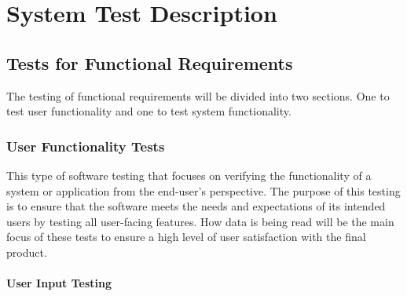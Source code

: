 \documentclass[12pt, titlepage]{article}
\begin{document}

\section{System Test Description}
	
\subsection{Tests for Functional Requirements}

The testing of functional requirements will be divided into two sections. One to test user functionality and one to test system functionality. 

\subsubsection{User Functionality Tests}

This type of software testing that focuses on verifying the functionality of a system or application from the end-user's perspective. The purpose of this testing is to ensure that the software meets the needs and expectations of its intended users by testing all user-facing features. How data is being read will be the main focus of these tests to ensure a high level of user satisfaction with the final product.



		
\paragraph{User Input Testing}
\end{document}
